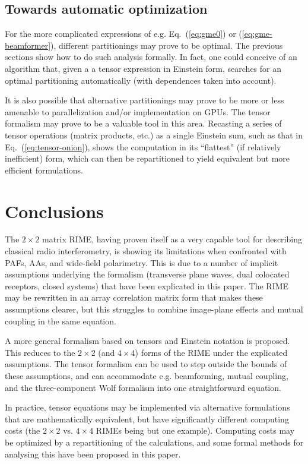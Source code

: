 \documentclass[]{aa}
\begin{document}
\subsection{Towards automatic optimization}

For the more complicated expressions of e.g. Eq.~(\ref{eq:gme0}) or (\ref{eq:gme-beamformer}), different partitionings may prove to be optimal. The previous sections show how to do such analysis formally. In fact, one could conceive of an algorithm that, given a a tensor expression in Einstein form, searches for an optimal partitioning automatically (with dependences taken into account).

It is also possible that alternative partitionings may prove to be more or less amenable to parallelization and/or implementation on GPUs. The tensor formalism may prove to be a valuable tool in this area. Recasting a series of tensor operations (matrix products, etc.) as a single Einstein sum, such as that in Eq.~(\ref{eq:tensor-onion}), shows the computation in its ``flattest'' (if relatively inefficient) form, which can then be repartitioned to yield equivalent but more efficient formulations.

\section{Conclusions}

The $2\times2$ matrix RIME, having proven itself as a very capable tool for describing classical radio interferometry, is showing its limitations when confronted with PAFs, AAs, and wide-field polarimetry. This is due to a number of implicit assumptions underlying the formalism (transverse plane waves, dual colocated receptors, closed systems) that have been explicated in this paper. The RIME may be rewritten in an array correlation matrix form that makes these assumptions clearer, but this struggles to combine image-plane effects and mutual coupling in the same equation.

A more general formalism based on tensors and Einstein notation is proposed. This reduces to the $2\times2$ (and $4\times4$) forms of the RIME under the explicated assumptions. The tensor formalism can be used to step outside the bounds of these assumptions, and can accommodate e.g.
beamforming, mutual coupling, and the three-component Wolf formalism into one straightforward equation. 

In practice, tensor equations may be implemented via alternative formulations that are mathematically equivalent, but have significantly different 
computing costs (the $2\times2$ vs. $4\times4$ RIMEs being but one example). Computing costs may be optimized by a repartitioning of the calculations, and some formal methods for analysing this have been proposed in this paper.
\end{document}
